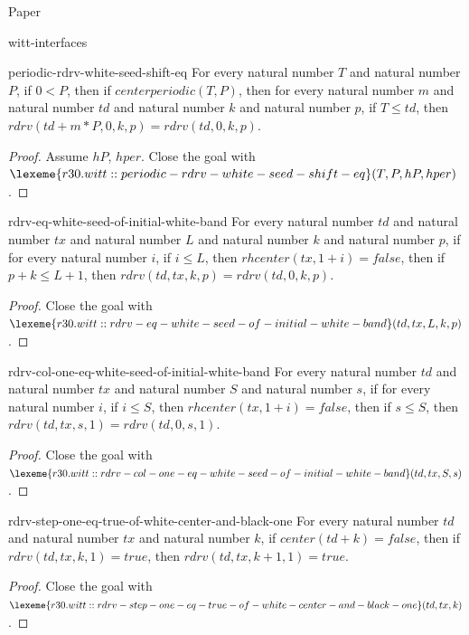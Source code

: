\begin{lexlean}{Paper}
\begin{section}{witt-interfaces}
  \begin{theorem}{periodic-rdrv-white-seed-shift-eq}
  For every natural number \(T\) and natural number \(P\), if \(0 < P\), then if \(centerperiodic(T, P)\), then for every natural number \(m\) and natural number \(td\) and natural number \(k\) and natural number \(p\), if \(T ≤ td\), then \(rdrv(td + m * P, 0, k, p) = rdrv(td, 0, k, p)\).
  \begin{proof}
  Assume \(hP\), \(hper\).
  Close the goal with \(\lexeme{r30.witt::periodic-rdrv-white-seed-shift-eq}(T, P, hP, hper)\).
  \end{proof}
  \end{theorem}

  \begin{theorem}{rdrv-eq-white-seed-of-initial-white-band}
  For every natural number \(td\) and natural number \(tx\) and natural number \(L\) and natural number \(k\) and natural number \(p\), if for every natural number \(i\), if \(i ≤ L\), then \(rhcenter(tx, 1 + i) = false\), then if \(p + k ≤ L + 1\), then \(rdrv(td, tx, k, p) = rdrv(td, 0, k, p)\).
  \begin{proof}
  Close the goal with \(\lexeme{r30.witt::rdrv-eq-white-seed-of-initial-white-band}(td, tx, L, k, p)\).
  \end{proof}
  \end{theorem}

  \begin{theorem}{rdrv-col-one-eq-white-seed-of-initial-white-band}
  For every natural number \(td\) and natural number \(tx\) and natural number \(S\) and natural number \(s\), if for every natural number \(i\), if \(i ≤ S\), then \(rhcenter(tx, 1 + i) = false\), then if \(s ≤ S\), then \(rdrv(td, tx, s, 1) = rdrv(td, 0, s, 1)\).
  \begin{proof}
  Close the goal with \(\lexeme{r30.witt::rdrv-col-one-eq-white-seed-of-initial-white-band}(td, tx, S, s)\).
  \end{proof}
  \end{theorem}

  \begin{theorem}{rdrv-step-one-eq-true-of-white-center-and-black-one}
  For every natural number \(td\) and natural number \(tx\) and natural number \(k\), if \(center(td + k) = false\), then if \(rdrv(td, tx, k, 1) = true\), then \(rdrv(td, tx, k + 1, 1) = true\).
  \begin{proof}
  Close the goal with \(\lexeme{r30.witt::rdrv-step-one-eq-true-of-white-center-and-black-one}(td, tx, k)\).
  \end{proof}
  \end{theorem}


\end{section}
\end{lexlean}
